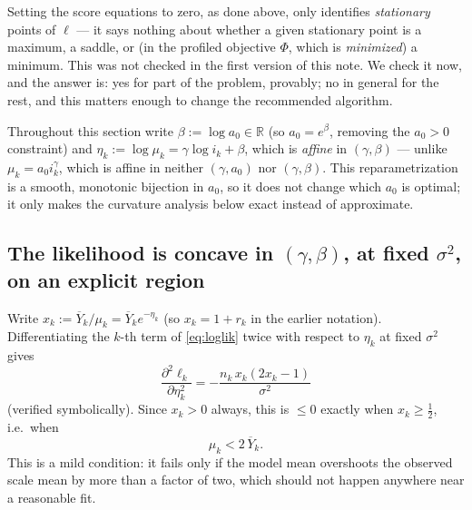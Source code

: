 \documentclass[11pt]{article}
\begin{document}
Setting the score equations to zero, as done above, only identifies
\emph{stationary} points of $\ell$ --- it says nothing about whether a given
stationary point is a maximum, a saddle, or (in the profiled objective
$\Phi$, which is \emph{minimized}) a minimum. This was not checked in the
first version of this note. We check it now, and the answer is: yes for part
of the problem, provably; no in general for the rest, and this matters enough
to change the recommended algorithm.

Throughout this section write $\beta := \log a_0 \in \mathbb{R}$ (so
$a_0 = e^\beta$, removing the $a_0>0$ constraint) and
$\eta_k := \log \mu_k = \gamma \log i_k + \beta$, which is \emph{affine} in
$(\gamma,\beta)$ --- unlike $\mu_k = a_0 i_k^\gamma$, which is affine in
neither $(\gamma,a_0)$ nor $(\gamma,\beta)$. This reparametrization is a
smooth, monotonic bijection in $a_0$, so it does not change which $a_0$ is
optimal; it only makes the curvature analysis below exact instead of
approximate.

\subsection{The likelihood is concave in \texorpdfstring{$(\gamma,\beta)$}{(gamma,beta)}, at fixed \texorpdfstring{$\sigma^2$}{sigma^2}, on an explicit region}

Write $x_k := \overline{Y}_k/\mu_k = \overline{Y}_k e^{-\eta_k}$ (so $x_k=1+r_k$
in the earlier notation). Differentiating the $k$-th term of
\eqref{eq:loglik} twice with respect to $\eta_k$ at fixed $\sigma^2$ gives
\begin{equation}
\label{eq:ellkpp}
  \frac{\partial^2 \ell_k}{\partial \eta_k^2}
  = -\frac{n_k\, x_k (2x_k - 1)}{\sigma^2}
\end{equation}
(verified symbolically). Since $x_k>0$ always, this is $\le 0$ exactly when
$x_k \ge \tfrac12$, i.e.\ when
\begin{equation}
\label{eq:goodregion}
  \mu_k < 2\,\overline{Y}_k.
\end{equation}
This is a mild condition: it fails only if the model mean overshoots the
observed scale mean by more than a factor of two, which should not happen
anywhere near a reasonable fit.
\end{document}
